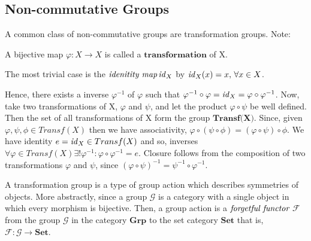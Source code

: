 \subsection{Non-commutative Groups} %
\label{sec:noncommutative-groups}
A common class of non-commutative groups are transformation groups.
Note:
\begin{defn}[Transformation]
 A bijective map $\varphi: X \to X$ is called a $\textbf{transformation}$ of X.
 \begin{note}
  The most trivial case is the $\emph{idenitity map} \, \mathit{id}_{X}$ by $\mathit{id}_{X}(x) = x, \, \forall x \in X$.
 \end{note}
\end{defn}
Hence, there exists a inverse $\varphi^{-1}$ of $\varphi$ such that $\varphi^{-1} \circ \varphi = \mathit{id}_{X} = \varphi \circ \varphi^{-1}$.
Now, take two transformations of X, $\varphi$ and $\psi$, and let the product $\varphi \circ \psi$ be well defined.
Then the set of all transformations of X form the group $\textbf{Transf(X)}$.
Since, given $\varphi , \psi , \phi \in Transf(X)$ then we have associativity, $\varphi \circ (\psi \circ \phi) = (\varphi \circ \psi) \circ \phi$.
We have identity $e = \mathit{id}_{X} \in Transf(X)$ and so, inverses $\forall \varphi \in Transf(X) \exists ! \varphi^{-1} : \varphi \circ \varphi^{-1} = e$.
Closure follows from the composition of two transformations $\varphi$ and $\psi$, since $(\varphi \circ \psi)^{-1} = \psi^{-1} \circ \varphi^{-1}$.

A transformation group is a type of group action which describes symmetries of objects. More abstractly,
since a group $\mathcal{G}$ is a category with a single object in which every morphism is bijective.
Then, a group action is a $\emph{forgetful functor}$ $\mathcal{F}$ from the group $\mathcal{G}$ in the category $\textbf{Grp}$
to the set category $\textbf{Set}$ that is, $\mathcal{F} : \mathcal{G} \to \textbf{Set}$.
